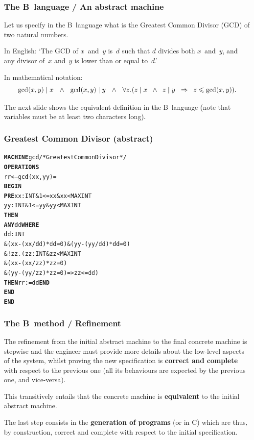 \documentclass[compress,dvipdfmx]{beamer}
\begin{document}
\begin{frame}
  \frametitle{The B~language / An abstract machine}

  Let us specify in the B~language what is the Greatest Common Divisor
  (GCD) of two natural numbers.

  \bigskip

  In English: `The GCD of \(x\)~and~\(y\) is~\(d\) such that \(d\)
  divides both \(x\)~and~\(y\), and any divisor of~\(x\) and~\(y\) is
  lower than or equal to~\(d\).'

  \bigskip

  In mathematical notation:
  \begin{equation*}
    \tiny
    \gcd(x,y) \mid x \quad\land\quad
    \gcd(x,y) \mid y \quad\wedge\quad
    \forall z.(z \mid x \;\;\wedge\;\; z \mid y
    \;\; \Rightarrow\;\; z \leqslant \gcd(x,y)).
  \end{equation*}

  The next slide shows the equivalent definition in the B~language
  (note that variables must be at least two characters long).

\end{frame}


\begin{frame}[fragile]
  \frametitle{Greatest Common Divisor (abstract)}

\begin{alltt}
\small
\textbf{MACHINE} gcd /* Greatest Common Divisor */
\textbf{OPERATIONS}
  rr <-- gcd (xx,yy) =
    \textbf{BEGIN}
      \textbf{PRE} xx : INT \& 1 <= xx \& xx < MAXINT
          yy : INT \& 1 <= yy \& yy < MAXINT
      \textbf{THEN}
        \textbf{ANY} dd \textbf{WHERE}
         dd : INT
            \& (xx-(xx/dd)*dd = 0) \& (yy-(yy/dd)*dd = 0)
            \& !zz.(zz : INT \& zz < MAXINT
                   \& (xx-(xx/zz)*zz = 0)
                   \& (yy-(yy/zz)*zz = 0) => zz <= dd)
        \textbf{THEN} rr := dd \textbf{END}
      \textbf{END}
    \textbf{END}
\end{alltt}

\end{frame}


\begin{frame}
  \frametitle{The B~method / Refinement}

  The refinement from the initial abstract machine to the final
  concrete machine is stepwise and the engineer must provide more
  details about the low\hyp{}level aspects of the system, whilst
  proving the new specification is \textbf{correct and complete} with
  respect to the previous one (all its behaviours are expected by the
  previous one, and vice\hyp{}versa).

  \bigskip

  This transitively entails that the concrete machine is
  \textbf{equivalent} to the initial abstract machine.

  \bigskip

  The last step consists in the \textbf{generation of \Ada programs}
  (or in \textsf{C}) which are thus, by construction, correct and
  complete with respect to the initial specification.

\end{frame}
\end{document}
